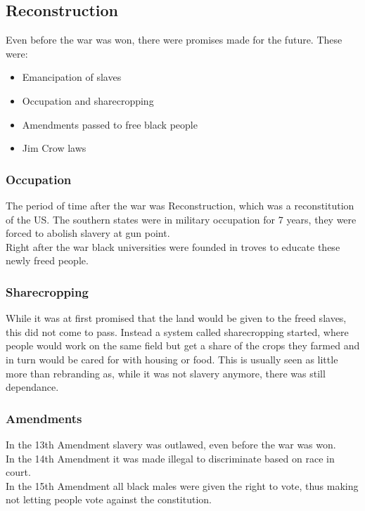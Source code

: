 \documentclass{article}
\begin{document}
	\subsection{Reconstruction}
	Even before the war was won, there were promises made for the future. These were:
	\begin{itemize}
		\item{Emancipation of slaves}
		\item{Occupation and sharecropping}
		\item{Amendments passed to free black people}
		\item{Jim Crow laws}
	\end{itemize}
	\subsubsection{Occupation}
	The period of time after the war was Reconstruction, which was a reconstitution of the US. The southern states were in military occupation for 7 years, they were forced to abolish slavery at gun point. \\
	Right after the war black universities were founded in troves to educate these newly freed people. \\
	\subsubsection{Sharecropping}
	While it was at first promised that the land would be given to the freed slaves, this did not come to pass. Instead a system called sharecropping started, where people would work on the same field but get a share of the crops they farmed and in turn would be cared for with housing or food. This is usually seen as little more than rebranding as, while it was not slavery anymore, there was still dependance. \\
	\subsubsection{Amendments}
	In the 13th Amendment slavery was outlawed, even before the war was won. \\
	In the 14th Amendment it was made illegal to discriminate based on race in court. \\
	In the 15th Amendment all black males were given the right to vote, thus making not letting people vote against the constitution. \\
\end{document}
